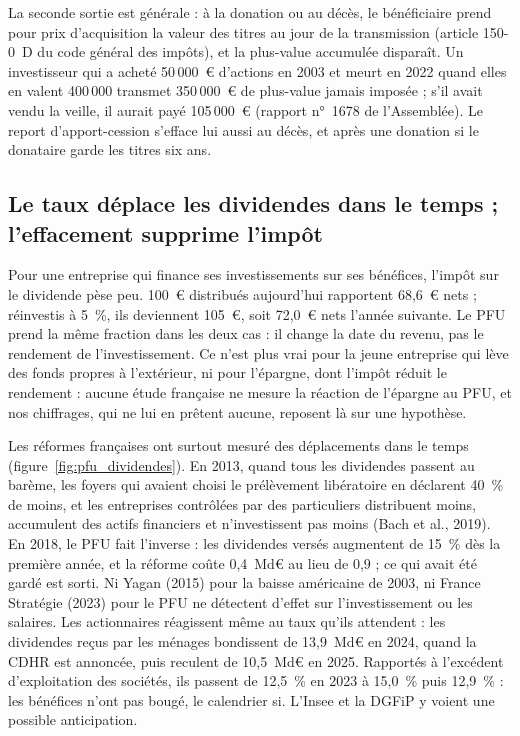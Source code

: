 La seconde sortie est générale : à la donation ou au décès, le bénéficiaire prend pour prix d'acquisition la valeur
des titres au jour de la transmission (article 150-0~D du code général des impôts), et la plus-value accumulée
disparaît. Un investisseur qui a acheté 50\,000~€ d'actions en 2003 et meurt en 2022 quand elles en valent 400\,000
transmet 350\,000~€ de plus-value jamais imposée ; s'il avait vendu la veille, il aurait payé 105\,000~€ (rapport
n°~1678 de l'Assemblée). Le report d'apport-cession s'efface lui aussi au décès, et après une donation si le
donataire garde les titres six ans.

\subsection{Le taux déplace les dividendes dans le temps ; l'effacement supprime l'impôt}\label{sec:pfu_probleme}

Pour une entreprise qui finance ses investissements sur ses bénéfices, l'impôt sur le dividende pèse peu. 100~€
distribués aujourd'hui rapportent 68,6~€ nets ; réinvestis à 5~\%, ils deviennent 105~€, soit 72,0~€ nets l'année
suivante. Le PFU prend la même fraction dans les deux cas : il change la date du revenu, pas le rendement de
l'investissement. Ce n'est plus vrai pour la jeune entreprise qui lève des fonds propres à l'extérieur, ni pour
l'épargne, dont l'impôt réduit le rendement : aucune étude française ne mesure la réaction de l'épargne au PFU, et
nos chiffrages, qui ne lui en prêtent aucune, reposent là sur une hypothèse.

Les réformes françaises ont surtout mesuré des déplacements dans le temps (figure~\ref{fig:pfu_dividendes}). En
2013, quand tous les dividendes passent au barème, les foyers qui avaient choisi le prélèvement libératoire en
déclarent 40~\% de moins, et les entreprises contrôlées par des particuliers distribuent moins, accumulent des
actifs financiers et n'investissent pas moins (Bach et al., 2019). En 2018, le PFU fait l'inverse : les dividendes
versés augmentent de 15~\% dès la première année, et la réforme coûte 0,4~Md€ au lieu de 0,9 ; ce qui avait été
gardé est sorti. Ni Yagan (2015) pour la baisse américaine de 2003, ni France Stratégie (2023) pour le PFU ne détectent d'effet
sur l'investissement ou les salaires. Les actionnaires réagissent même au taux qu'ils attendent : les dividendes reçus
par les ménages bondissent de 13,9~Md€ en 2024, quand la CDHR est annoncée, puis reculent de 10,5~Md€ en 2025.
Rapportés à l'excédent d'exploitation des sociétés, ils passent de 12,5~\% en 2023 à 15,0~\% puis 12,9~\% : les
bénéfices n'ont pas bougé, le calendrier si. L'Insee et la DGFiP y voient une possible anticipation.

